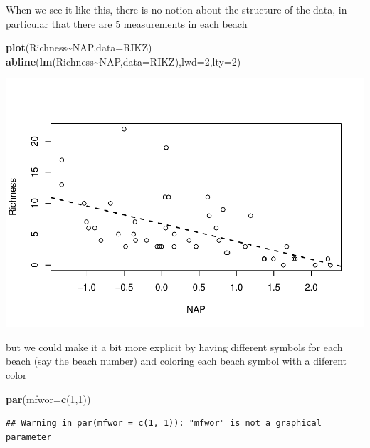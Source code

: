 \documentclass[
]{book}
\newenvironment{Shaded}{\begin{snugshade}}{\end{snugshade}}
\newcommand{\AttributeTok}[1]{\textcolor[rgb]{0.13,0.29,0.53}{#1}}
\newcommand{\DecValTok}[1]{\textcolor[rgb]{0.00,0.00,0.81}{#1}}
\newcommand{\FunctionTok}[1]{\textcolor[rgb]{0.13,0.29,0.53}{\textbf{#1}}}
\newcommand{\NormalTok}[1]{#1}
\newcommand{\SpecialCharTok}[1]{\textcolor[rgb]{0.81,0.36,0.00}{\textbf{#1}}}
\begin{document}
When we see it like this, there is no notion about the structure of the data, in particular that there are 5 measurements in each beach

\begin{Shaded}
\begin{Highlighting}[]
\FunctionTok{plot}\NormalTok{(Richness}\SpecialCharTok{\textasciitilde{}}\NormalTok{NAP,}\AttributeTok{data=}\NormalTok{RIKZ)}
\FunctionTok{abline}\NormalTok{(}\FunctionTok{lm}\NormalTok{(Richness}\SpecialCharTok{\textasciitilde{}}\NormalTok{NAP,}\AttributeTok{data=}\NormalTok{RIKZ),}\AttributeTok{lwd=}\DecValTok{2}\NormalTok{,}\AttributeTok{lty=}\DecValTok{2}\NormalTok{)}
\end{Highlighting}
\end{Shaded}

\includegraphics{ECOMODbook_files/figure-latex/unnamed-chunk-62-1.pdf}

but we could make it a bit more explicit by having different symbols for each beach (say the beach number) and coloring each beach symbol with a diferent color

\begin{Shaded}
\begin{Highlighting}[]
\FunctionTok{par}\NormalTok{(}\AttributeTok{mfwor=}\FunctionTok{c}\NormalTok{(}\DecValTok{1}\NormalTok{,}\DecValTok{1}\NormalTok{))}
\end{Highlighting}
\end{Shaded}

\begin{verbatim}
## Warning in par(mfwor = c(1, 1)): "mfwor" is not a graphical parameter
\end{verbatim}
\end{document}
